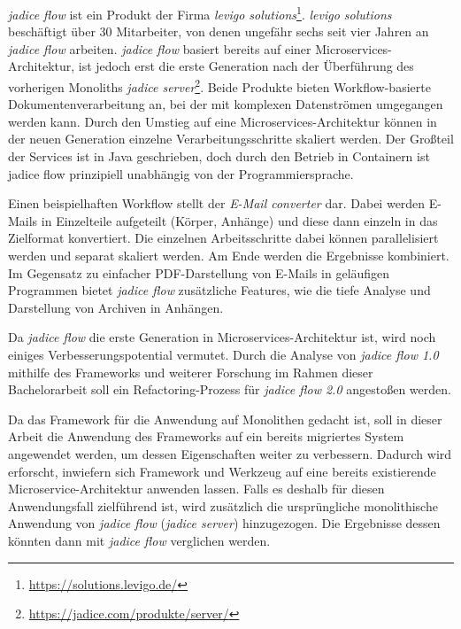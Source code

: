 \emph{jadice flow} ist ein Produkt der Firma \emph{levigo solutions}\footnote{\url{https://solutions.levigo.de/}}.
\emph{levigo solutions} beschäftigt über 30 Mitarbeiter, von denen ungefähr sechs seit vier Jahren an \emph{jadice flow} arbeiten.
\emph{jadice flow} basiert bereits auf einer Microservices-Architektur, ist jedoch erst die erste Generation nach der Überführung des vorherigen Monoliths \emph{jadice server}\footnote{\url{https://jadice.com/produkte/server/}}.
Beide Produkte bieten Workflow-basierte Dokumentenverarbeitung an, bei der mit komplexen Datenströmen umgegangen werden kann.
Durch den Umstieg auf eine Microservices-Architektur können in der neuen Generation einzelne Verarbeitungsschritte skaliert werden.
Der Großteil der Services ist in Java geschrieben, doch durch den Betrieb in Containern ist jadice flow prinzipiell unabhängig von der Programmiersprache.

Einen beispielhaften Workflow stellt der \emph{E-Mail converter} dar.
Dabei werden E-Mails in Einzelteile aufgeteilt (Körper, Anhänge) und diese dann einzeln in das Zielformat konvertiert.
Die einzelnen Arbeitsschritte dabei können parallelisiert werden und separat skaliert werden.
Am Ende werden die Ergebnisse kombiniert.
Im Gegensatz zu einfacher PDF-Darstellung von E-Mails in geläufigen Programmen bietet \emph{jadice flow} zusätzliche Features, wie die tiefe Analyse und Darstellung von Archiven in Anhängen.

Da \emph{jadice flow} die erste Generation in Microservices-Architektur ist, wird noch einiges Verbesserungspotential vermutet.
Durch die Analyse von \emph{jadice flow 1.0} mithilfe des Frameworks und weiterer Forschung im Rahmen dieser Bachelorarbeit soll ein Refactoring-Prozess für \emph{jadice flow 2.0} angestoßen werden.

Da das Framework für die Anwendung auf Monolithen gedacht ist, soll in dieser Arbeit die Anwendung des Frameworks auf ein bereits migriertes System angewendet werden, um dessen Eigenschaften weiter zu verbessern.
Dadurch wird erforscht, inwiefern sich Framework und Werkzeug auf eine bereits existierende Microservice-Architektur anwenden lassen.
Falls es deshalb für diesen Anwendungsfall zielführend ist, wird zusätzlich die ursprüngliche monolithische Anwendung von \emph{jadice flow} (\emph{jadice server}) hinzugezogen.
Die Ergebnisse dessen könnten dann mit \emph{jadice flow} verglichen werden.



